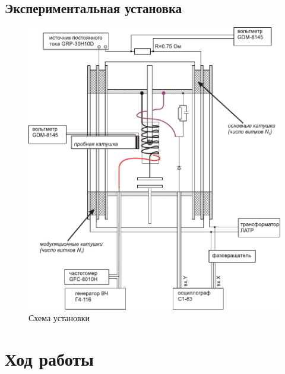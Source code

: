 \documentclass[a4paper, 12pt]{article}
\begin{document}
	\subsection{Экспериментальная установка}
	\begin{figure}[!htb]
		\centering
		\includegraphics[scale=0.5]{scheme.pdf}
		\caption{Схема установки}
	\end{figure}
	\newpage
	\section{Ход работы}
\end{document}
